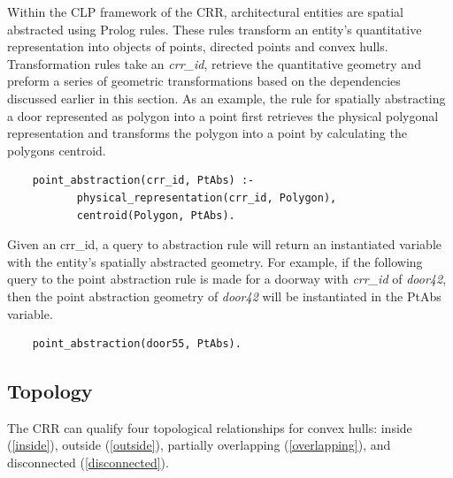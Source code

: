 \documentclass[12pt]{ucthesis}
\begin{document}
Within the CLP framework of the CRR, architectural entities are spatial abstracted using Prolog rules. These rules transform an entity's quantitative representation into objects of points, directed points and convex hulls. Transformation rules take an \emph{crr\_id}, retrieve the quantitative geometry and preform a series of geometric transformations based on the dependencies discussed earlier in this section. As an example, the rule for spatially abstracting a door represented as polygon into a point first retrieves the physical polygonal representation and transforms the polygon into a point by calculating the polygons centroid. 
\begin{verbatim}
    point_abstraction(crr_id, PtAbs) :-
           physical_representation(crr_id, Polygon),
           centroid(Polygon, PtAbs).
\end{verbatim} Given an crr\_id, a query to abstraction rule will return an instantiated variable with the entity's spatially abstracted geometry. For example, if the following query to the point abstraction rule is made for a doorway with \emph{crr\_id} of \emph{door42}, then the point abstraction geometry of \emph{door42} will be instantiated in the PtAbs variable.
\begin{verbatim}
    point_abstraction(door55, PtAbs).
\end{verbatim}





\subsection{Topology}
The CRR can qualify four topological relationships for convex hulls: inside (\ref{inside}), outside (\ref{outside}), partially overlapping (\ref{overlapping}), and disconnected (\ref{disconnected}). 
\end{document}
